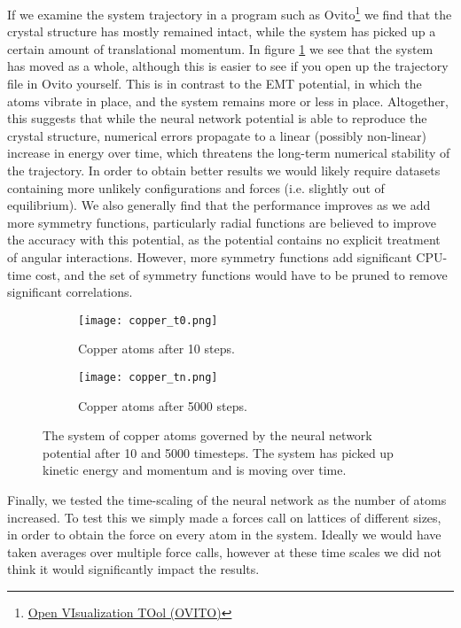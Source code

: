 If we examine the system trajectory in a program such as Ovito\footnote{
    \href{https://www.ovito.org/}{Open VIsualization TOol (OVITO)}}
we find that the crystal structure has mostly remained intact, while the
system has picked up a certain amount of translational momentum.
In figure \ref{fig:copper_sw} we see that the system has moved as a whole,
although this is easier to see if you open up the trajectory file in Ovito
yourself.
This is in contrast to the EMT potential, in which the atoms vibrate in place,
and the system remains more or less in place.
Altogether, this suggests that while the neural network potential
is able to reproduce the crystal structure, numerical errors propagate
to a linear (possibly non-linear)
increase in energy over time, which threatens the long-term numerical
stability of the trajectory. In order to obtain better results we would likely
require datasets containing more unlikely configurations and forces
(i.e. slightly out of equilibrium). We also generally find that the performance
improves as we add more symmetry functions, particularly radial functions
are believed to improve the accuracy with this potential,
as the potential contains no explicit treatment of angular interactions.
However, more symmetry functions add significant CPU-time cost,
and the set of symmetry functions would have to be pruned
to remove significant correlations.

\begin{figure}[H]
\begin{adjustbox}{max width=1.2\linewidth,center}
\centering
  \begin{subfigure}[b]{0.55\textwidth}
      \texttt{[image: copper\_t0.png]}
      \caption{Copper atoms after 10 steps.}
  \end{subfigure}
  \hfill
  \begin{subfigure}[b]{0.55\textwidth}
      \texttt{[image: copper\_tn.png]}
      \caption{Copper atoms after 5000 steps.}
  \end{subfigure}
\end{adjustbox}
    \caption{The system of copper atoms governed by the neural network
    potential after 10 and 5000 timesteps.
    The system has picked up kinetic energy and momentum and is moving
    over time.}
    \label{fig:copper_sw}
\end{figure}

Finally, we tested the time-scaling of the neural network as the number of atoms
increased. To test this we simply made a forces call on lattices of different
sizes, in order to obtain the force on every atom in the system.
Ideally we would have taken averages over multiple force calls, however
at these time scales we did not think it would significantly impact the results.

